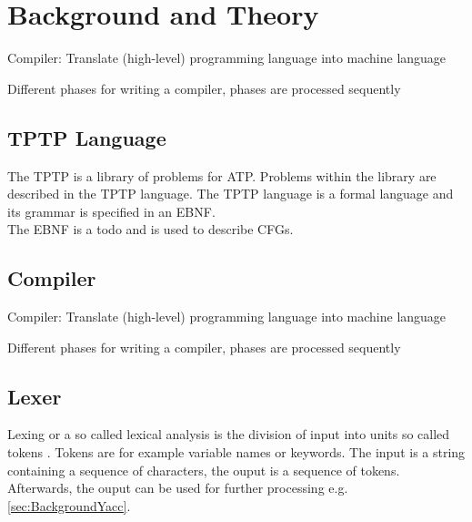 
\chapter{Background and Theory}\label{cha:Background}



\cite{Mogensen.2017}
Compiler: Translate (high-level) programming language into machine language

Different phases for writing a compiler, phases are processed sequently
\section{TPTP Language}\label{sec:BackgroundTPTP}
The \acf{TPTP} is a library of problems for \ac{ATP}.
Problems within the library are described in the \ac{TPTP} language.
The  \ac{TPTP} language is a formal language and its grammar is specified in an \ac{EBNF}. \cite{Sut17}\\
The \ac{EBNF} \cite{EBNF} is a todo and is used to describe \acp{CFG}.


\section{Compiler}\label{sec:BackgroundCompiler}

\cite{Mogensen.2017}
Compiler: Translate (high-level) programming language into machine language

Different phases for writing a compiler, phases are processed sequently

\section{Lexer}\label{sec:BackgroundLexer}


Lexing or a so called lexical analysis is the division of input into units so called tokens \cite{LexYacc.1992}. Tokens are for example variable names or keywords.
The input is a string containing a sequence of characters, the ouput is a sequence of tokens. 
Afterwards, the ouput can be used for further processing e.g. \ref{sec:BackgroundYacc}.


